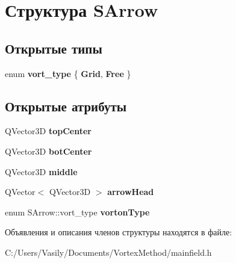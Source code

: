 \hypertarget{struct_s_arrow}{}\section{Структура S\+Arrow}
\label{struct_s_arrow}
\subsection*{Открытые типы}
\begin{DoxyCompactItemize}
\item 
\mbox{\label{struct_s_arrow_aa1f46fe67a18adb7542f9ff1858b023e}} 
enum {\bfseries vort\+\_\+type} \{ {\bfseries Grid}, 
{\bfseries Free}
 \}
\end{DoxyCompactItemize}
\subsection*{Открытые атрибуты}
\begin{DoxyCompactItemize}
\item 
\mbox{\label{struct_s_arrow_a23abf2a8d2d6f1c86720bc5f6ac2b9e6}} 
Q\+Vector3D {\bfseries top\+Center}
\item 
\mbox{\label{struct_s_arrow_a93fb3cef3c24d14f63e0737a4143a9d2}} 
Q\+Vector3D {\bfseries bot\+Center}
\item 
\mbox{\label{struct_s_arrow_adf219daf12c25d1ebca5f772035c82c1}} 
Q\+Vector3D {\bfseries middle}
\item 
\mbox{\label{struct_s_arrow_ae4b25f5b8163fb06eba3ce48a37083a4}} 
Q\+Vector$<$ Q\+Vector3D $>$ {\bfseries arrow\+Head}
\item 
\mbox{\label{struct_s_arrow_aa16f04df26b9e837fd384ef04fe64011}} 
enum S\+Arrow\+::vort\+\_\+type {\bfseries vorton\+Type}
\end{DoxyCompactItemize}


Объявления и описания членов структуры находятся в файле\+:\begin{DoxyCompactItemize}
\item 
C\+:/\+Users/\+Vasily/\+Documents/\+Vortex\+Method/mainfield.\+h\end{DoxyCompactItemize}
